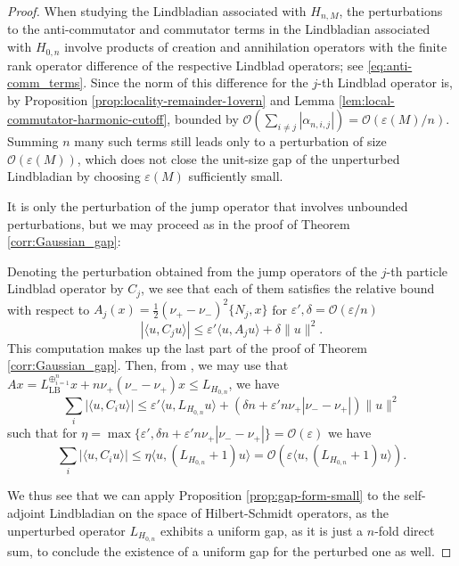 \documentclass[11pt]{amsart}
\newcommand{\1}{\mathbbm{1}}
\theoremstyle{plain}
\theoremstyle{definition}
\theoremstyle{remark}
\numberwithin{equation}{section}
\begin{document}
\begin{proof}
When studying the Lindbladian associated with $H_{n,M}$, the perturbations to the anti-commutator and commutator terms in the Lindbladian associated with $H_{0,n}$ involve products of creation and annihilation operators with the finite rank operator difference of the respective Lindblad operators; see \eqref{eq:anti-comm_terms}. Since the norm of this difference for the $j$-th Lindblad operator is, by Proposition \ref{prop:locality-remainder-1overn} and Lemma \ref{lem:local-commutator-harmonic-cutoff}, bounded by $\mathcal O(\sum_{i\neq j}|\alpha_{n,i,j}|)=\mathcal O(\varepsilon(M)/n)$. Summing $n$ many such terms still leads only to a perturbation of size $\mathcal O(\varepsilon(M))$, which does not close the unit-size gap of the unperturbed Lindbladian by choosing $\varepsilon(M)$ sufficiently small. 


It is only the perturbation of the jump operator that involves unbounded perturbations, but we may proceed as in the proof of Theorem \ref{corr:Gaussian_gap}:

Denoting the perturbation obtained from the jump operators of the $j$-th particle Lindblad operator by $C_j$, we see that each of them satisfies the relative bound with respect to $A_j(x)=\frac{1}{2}(\nu_+-\nu_-)^2\{N_j,x\}$ for $\varepsilon',\delta=\mathcal O(\varepsilon/n)$
\begin{equation}
|\langle u,C_ju\rangle|
\le \varepsilon' \langle u,A_j u\rangle + \delta \|u\|^2. 
\end{equation}
This computation makes up the last part of the proof of Theorem \ref{corr:Gaussian_gap}.
Then, from \cite[Proof of Thm.~6.3]{OU}, we may use that $Ax=L_{\operatorname{LB}}^{\oplus_{i=1}^n}x+n \nu_+(\nu_--\nu_+)x \le L_{H_{0,n}} $, we have 
\[\sum_{i} |\langle u,C_i u\rangle|
\le \varepsilon' \langle u,L_{H_{0,n}} u\rangle + \left(\delta n +  \varepsilon' n\nu_+ | \nu_--\nu_+| \right) \|u\|^2 \]
such that for $\eta = \max\{\varepsilon',\delta n +  \varepsilon' n\nu_+ |\nu_--\nu_+| \} =\mathcal O(\varepsilon)$ we have 
\[\sum_{i} |\langle u,C_i u\rangle| \le \eta \langle u,(L_{H_{0,n}}+1) u\rangle= \mathcal O( \varepsilon \langle u,(L_{H_{0,n}}+1) u\rangle). \]

We thus see that we can apply Proposition \ref{prop:gap-form-small} to the self-adjoint Lindbladian on the space of Hilbert-Schmidt operators, as the unperturbed operator $L_{H_{0,n}}$ exhibits a uniform gap, as it is just a $n$-fold direct sum, to conclude the existence of a uniform gap for the perturbed one as well. 
\end{proof}
\end{document}
